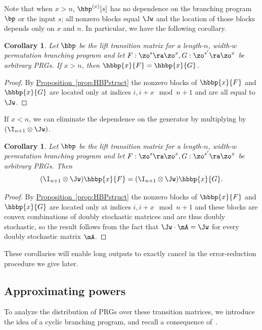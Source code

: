 \documentclass[11pt]{article}
\newcommand{\expref}[2]{\texorpdfstring{\hyperref[#2]{#1~\ref{#2}}}{#1~\ref{#2}}}
\newtheorem{corollary}[theorem]{Corollary}
\begin{document}
Note that when $x>n$, $\hbp^{(x)}[s]$ has no dependence on the branching program $\bp$ or the input $s$; all nonzero blocks equal $\Jw$ and the location of those blocks depends only on $x$ and $n$. In particular, we %
have the following corollary.  %
\begin{corollary}\label{cor:longPRGtriv}
Let $\hbp$ be the lift transition matrix for a length-$n$, width-$w$ permutation branching program and let $F:\zo^s\ra\zo^x,G:\zo^{s'}\ra\zo^x$ be arbitrary PRGs. If $x>n$, then $\hbbp{x}{F}=\hbbp{x}{G}$.
\end{corollary}
\begin{proof}
By \expref{Proposition}{prop:HBPstruct} the nonzero blocks of $\hbbp{x}{F}$ and $\hbbp{x}{G}$ are located only at indices $i,i+x \mod n+1$ and are all equal to $\Jw$.
\end{proof}
If $x<n$, we can eliminate the dependence on the generator by multiplying by $(\I_{n+1}\otimes \Jw)$.
\begin{corollary}\label{cor:hbpCommutes}
Let $\hbp$ be the lift transition matrix for a length-$n$, width-$w$ permutation branching program and let $F:\zo^s\ra\zo^x,G:\zo^{s'}\ra\zo^x$ be arbitrary PRGs. Then
\[(\I_{n+1}\otimes \Jw)\hbbp{x}{F}=(\I_{n+1}\otimes \Jw)\hbbp{x}{G}.\]
\end{corollary}
\begin{proof}
By \expref{Proposition}{prop:HBPstruct} the nonzero blocks of $\hbbp{x}{F}$ and $\hbbp{x}{G}$ are located only at indices $i,i+x \mod n+1$ and these blocks are convex combinations of doubly stochastic matrices and are thus doubly stochastic, so the result follows from the fact that $\Jw\cdot\mA=\Jw$ for every doubly stochastic matrix $\mA$.
\end{proof}
These corollaries will enable long outputs to exactly cancel in the error-reduction procedure we give later.

\subsection{Approximating powers}
To analyze the distribution of PRGs over these transition matrices, we introduce the idea of a cyclic branching program, and recall a consequence of~\cite{HozaPyVa21}.
    
\end{document}

